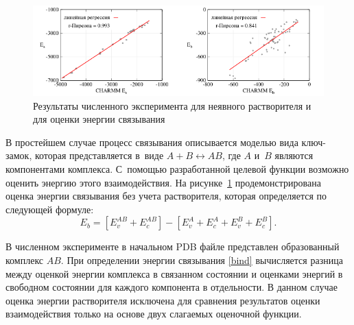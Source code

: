 \begin{figure}[h!]
	\centering
	\includegraphics[width=1.0\linewidth]{images/second.pdf}
	\caption{Результаты численного эксперимента для неявного растворителя и для оценки энергии связывания}
	\label{second}
\end{figure}

В простейшем случае процесс связывания описывается моделью вида ключ-замок, которая представляется в~виде $A+B\leftrightarrow AB$, где $A$ и~$B$ являются компонентами комплекса. С~помощью разработанной целевой функции возможно оценить энергию этого взаимодействия. На рисунке~\ref{second} продемонстрирована оценка энергии связывания без учета растворителя, которая определяется по следующей формуле:
\begin{equation}
	E_{b}=\left[E_{v}^{AB} + E_{c}^{AB}\right] - \left[E_{v}^{A} + E_{c}^{A} + E_{v}^{B} + E_{c}^{B}\right].
	\label{bind}
\end{equation}

В численном эксперименте в начальном PDB файле представлен образованный комплекс $AB$. При определении энергии связывания \eqref{bind} вычисляется разница между оценкой энергии комплекса в связанном состоянии и оценками энергий в свободном состоянии для каждого компонента в отдельности. В данном случае оценка энергии растворителя исключена для сравнения результатов оценки взаимодействия только на основе двух слагаемых оценочной функции.
